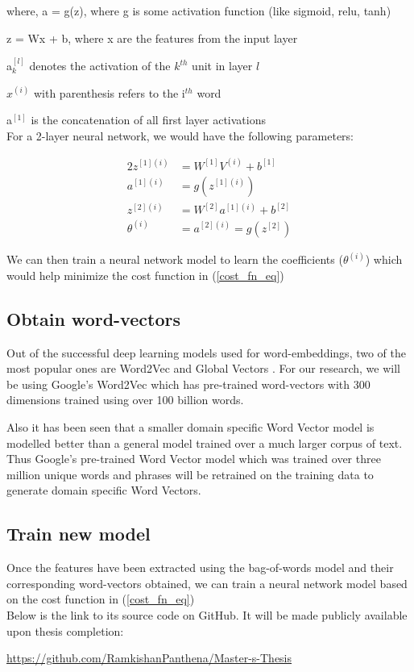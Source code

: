 \noindent where, a = g(z), where g is some activation function (like sigmoid, relu, tanh)

\quad\quad z = Wx + b, where x are the features from the input layer

\quad\quad a$^{[l]}_{k}$ denotes the activation of the $k^{th}$ unit in layer $l$

\quad\quad $x^{(i)}$ with parenthesis refers to the i$^{th}$ word

\quad\quad a$^{[1]}$ is the concatenation of all first layer activations\\

\noindent For a 2-layer neural network, we would have the following parameters:

\begin{alignat}{2}
z^{[1](i)} & = W^{[1]}V^{(i)} + b^{[1]}\\
a^{[1](i)} & = g(z^{[1](i)})\\
z^{[2](i)} & = W^{[2]}a^{[1](i)} + b^{[2]}\\
\theta^{(i)} & = a^{[2](i)} = g(z^{[2]})
\end{alignat}

\noindent We can then train a neural network model to learn the coefficients ($\theta^{(i)}$) which would help minimize the cost function in (\ref{cost_fn_eq})


\subsection{Obtain word-vectors}

Out of the successful deep learning models used for word-embeddings, two of the most popular ones are Word2Vec \cite{le2014distributed} and Global Vectors \cite{pennington2014glove}. For our research, we will be using Google's Word2Vec which has pre-trained word-vectors with 300 dimensions trained using over 100 billion words. 

Also it has been seen that a smaller domain specific Word Vector model is modelled better than a general model trained over a much larger corpus of text. Thus Google's pre-trained Word Vector model which was trained over three million unique words and phrases will be retrained on the training data to generate domain specific Word Vectors.

\subsection{Train new model}

Once the features have been extracted using the bag-of-words model and their corresponding word-vectors obtained, we can train a neural network model based on the cost function in (\ref{cost_fn_eq})\\

\noindent Below is the link to its source code on GitHub. It will be made publicly available upon thesis completion:

\noindent \url{https://github.com/RamkishanPanthena/Master-s-Thesis}